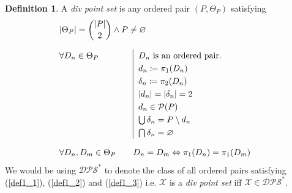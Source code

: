 \documentclass[11pt, oneside]{article}      %
\theoremstyle{definition}
\newtheorem{defn}{Definition}
\numberwithin{equation}{section}
\newcommand{\reff}[1]{(\ref{#1})}
\theoremstyle{c}
\begin{document}
\begin{defn} A  \textit{div point set} is any ordered pair $(P,\Theta_P)$ satisfying
\begin{alignat}{2}
  \label{def1_1}
  &\mathrlap{\lvert\Theta_P\rvert = \binom{\lvert P\rvert}{2} \land P \not= \varnothing} \\[1.5ex]
  \label{def1_2}
  & \forall D_n \in \Theta_P & \quad & \begin{aligned}[t] \renewcommand\arraystretch{1.25}\begin{array}[t]{|@{\hskip0.6em}l} \color{black}
  D_n \text{ is an ordered pair. } \\
  d_n \coloneqq \pi_1(D_n) \\
  \delta_n \coloneqq \pi_2(D_n) \\
  \lvert d_n\rvert = \lvert\delta_n\rvert =2\\
  d_n \in \mathcal{P}(P)\\
  \bigcup \delta_n = P \setminus d_n \\
  \bigcap \delta_n = \varnothing
  \end{array}
  \end{aligned}\\[1.5ex]
  \label{def1_3}
    & \forall D_n, D_m \in \Theta_P &\quad & D_n=D_m \Leftrightarrow  \pi_1(D_n)= \pi_1(D_m)
\end{alignat}
We would be using $\mathscr{DPS}^*$ to denote the class of all ordered pairs satisfying \reff{def1_1}, \reff{def1_2} and \reff{def1_3} i.e. $\mathscr{X}$ is a \textit{div point set} iff $\mathscr{X} \in \mathscr{DPS}^*$.
\end{defn}
\end{document}
